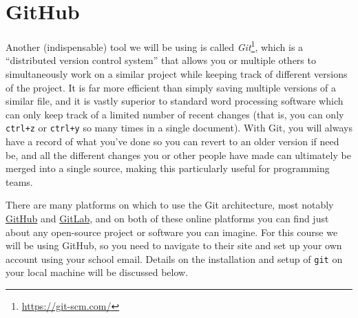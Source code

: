 \documentclass{tufte-book}
\begin{document}
\section{GitHub}\label{sec:github} %

{Another} (indispensable) tool we will be using is called \textit{Git}\footnote{\href{https://git-scm.com/}{https://git-scm.com/}}, which is a ``distributed version control system'' that allows you or multiple others to simultaneously work on a similar project while keeping track of different versions of the project. It is far more efficient than simply saving multiple versions of a similar file, and it is vastly superior to standard word processing software which can only keep track of a limited number of recent changes (that is, you can only \texttt{ctrl+z} or \texttt{ctrl+y} so many times in a single document). With Git, you will always have a record of what you've done so you can revert to an older version if need be, and all the different changes you or other people have made can ultimately be merged into a single source, making this particularly useful for programming teams.


There are many platforms on which to use the Git architecture, most notably {\href{https://www.github.com}{GitHub}} and {\href{https://www.gitlab.com}{GitLab}}, and on both of these online platforms you can find just about any open-source project or software you can imagine. For this course we will be using GitHub, so you need to navigate to their site and set up your own account using your school email. Details on the installation and setup of \verb|git| on your local machine will be discussed below.
\end{document}
